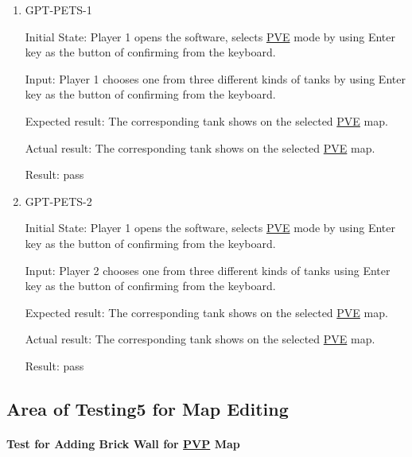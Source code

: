 \documentclass[12pt, titlepage]{article}
\begin{document}
\begin{enumerate}

\item{GPT-PETS-1\\}
					
Initial State: Player 1 opens the software, selects \underline{PVE} mode by using Enter key as the button of confirming from the keyboard.
					
Input: Player 1 chooses one from three different kinds of tanks by using Enter key as the button of confirming from the keyboard.
					
Expected result: The corresponding tank shows on the selected \underline{PVE} map.
					
Actual result: The corresponding tank shows on the selected \underline{PVE} map.

Result: pass

\item{GPT-PETS-2\\}
					
Initial State: Player 1 opens the software, selects \underline{PVE} mode by using Enter key as the button of confirming from the keyboard.
					
Input: Player 2 chooses one from three different kinds of tanks using Enter key as the button of confirming from the keyboard.
					
Expected result: The corresponding tank shows on the selected \underline{PVE} map.
					
Actual result: The corresponding tank shows on the selected \underline{PVE} map.

Result: pass

\end{enumerate}




\subsection{Area of Testing5 for Map Editing}

\paragraph{Test for Adding Brick Wall for \underline{PVP} Map}
\end{document}
